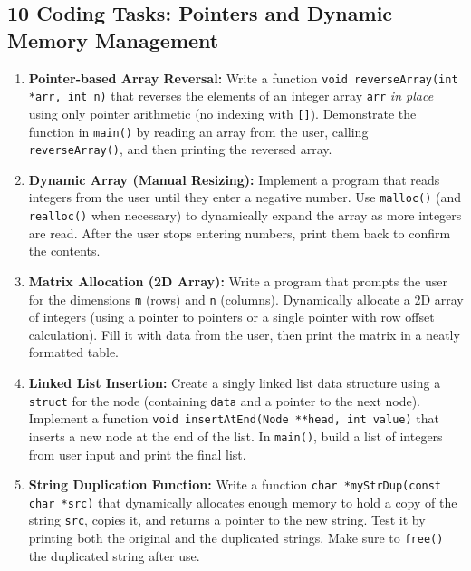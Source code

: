 \documentclass[a4paper,12pt]{article}
\begin{document}
\hrulefill

\newpage

\subsection{10 Coding Tasks: Pointers and Dynamic Memory Management}

\begin{enumerate}

  \item \textbf{Pointer-based Array Reversal:}  
  Write a function \texttt{void reverseArray(int *arr, int n)} that reverses the elements of an integer array \texttt{arr} \emph{in place} using only pointer arithmetic (no indexing with \texttt{[]}). Demonstrate the function in \texttt{main()} by reading an array from the user, calling \texttt{reverseArray()}, and then printing the reversed array.

  \item \textbf{Dynamic Array (Manual Resizing):}  
  Implement a program that reads integers from the user until they enter a negative number. Use \texttt{malloc()} (and \texttt{realloc()} when necessary) to dynamically expand the array as more integers are read. After the user stops entering numbers, print them back to confirm the contents.

  \item \textbf{Matrix Allocation (2D Array):}  
  Write a program that prompts the user for the dimensions \texttt{m} (rows) and \texttt{n} (columns). Dynamically allocate a 2D array of integers (using a pointer to pointers or a single pointer with row offset calculation). Fill it with data from the user, then print the matrix in a neatly formatted table.

  \item \textbf{Linked List Insertion:}  
  Create a singly linked list data structure using a \texttt{struct} for the node (containing \texttt{data} and a pointer to the next node). Implement a function \texttt{void insertAtEnd(Node **head, int value)} that inserts a new node at the end of the list. In \texttt{main()}, build a list of integers from user input and print the final list.

  \item \textbf{String Duplication Function:}  
  Write a function \texttt{char *myStrDup(const char *src)} that dynamically allocates enough memory to hold a copy of the string \texttt{src}, copies it, and returns a pointer to the new string. Test it by printing both the original and the duplicated strings. Make sure to \texttt{free()} the duplicated string after use.


\end{enumerate}
\end{document}
